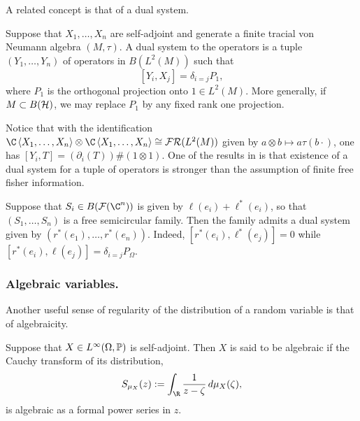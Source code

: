 A related concept is that of a dual system.
\begin{definition}
	\label{defn:dualsystem}
	Suppose that $X_1, \ldots, X_n$ are self-adjoint and generate a finite tracial von Neumann algebra $(M, \tau)$.
	A dual system to the operators is a tuple $(Y_1, \ldots, Y_n)$ of operators in $B(L^2(M))$ such that
	$$[Y_i, X_j] = \delta_{i=j}P_1,$$
	where $P_1$ is the orthogonal projection onto $1 \in L^2(M)$.
	More generally, if $M \subset B(\cH)$, we may replace $P_1$ by any fixed rank one projection.
\end{definition}
Notice that with the identification $\C\ang{X_1, \ldots, X_n}\otimes \C\ang{X_1, \ldots, X_n} \cong \mathcal{FR}(L^2(M))$ given by $a\otimes b \mapsto a\tau(b\cdot)$, one has $[Y_i, T] = (\partial_i(T))\#(1\otimes1)$.
One of the results in \cite{voiculescu1998fisherinfov} is that existence of a dual system for a tuple of operators is stronger than the assumption of finite free fisher information.

\begin{example}
	Suppose that $S_i \in B(\cF(\C^n))$ is given by $\ell(e_i) + \ell^*(e_i)$, so that $(S_1, \ldots, S_n)$ is a free semicircular family.
	Then the family admits a dual system given by $(r^*(e_1), \ldots, r^*(e_n))$.
	Indeed, $[r^*(e_i), \ell^*(e_j)] = 0$ while $[r^*(e_i), \ell(e_j)] = \delta_{i=j}P_\Omega$.
\end{example}

\subsubsection{Algebraic variables.}
Another useful sense of regularity of the distribution of a random variable is that of algebraicity.

\begin{definition}
	Suppose that $X \in L^\infty(\Omega, \P)$ is self-adjoint.
	Then $X$ is said to be algebraic if the Cauchy transform of its distribution,
	$$S_{\mu_X}(z) := \int_\R \frac1{z-\zeta}\,d\mu_X(\zeta),$$
	is algebraic as a formal power series in $z$.
\end{definition}
